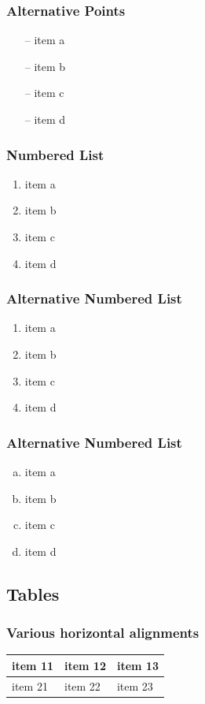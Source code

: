 \documentclass[12pt]{article}
\begin{document}
\subsubsection*{Alternative Points}
\begin{itemize}
\item[--] item a
\item[--] item b
\item[--] item c
\item[--] item d
\end{itemize}

\subsubsection*{Numbered List}
\begin{enumerate}
\item item a
\item item b
\item item c
\item item d
\end{enumerate}

\subsubsection*{Alternative Numbered List}
\begin{enumerate}[I]
\item item a
\item item b
\item item c
\item item d
\end{enumerate}

\subsubsection*{Alternative Numbered List}
\begin{enumerate}[a.]
\item item a
\item item b
\item item c
\item item d
\end{enumerate}

\subsection{Tables}
\subsubsection{Various horizontal alignments}
\begin{tabularx}{0.8\textwidth} {
  | >{\raggedright\arraybackslash}X
  | >{\centering\arraybackslash}X
  | >{\raggedleft\arraybackslash}X | }
 \hline
 item 11 & item 12 & item 13 \\
 \hline
 item 21  & item 22  & item 23  \\
\hline
\end{tabularx}
\end{document}
